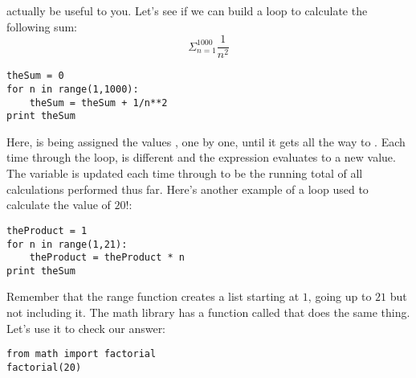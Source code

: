 actually be useful to you.  Let's see if we can build a loop to
calculate the following sum:
\begin{equation}
\Sigma_{n=1}^{1000} \frac{1}{n^2}
\end{equation}
\begin{Verbatim}
theSum = 0
for n in range(1,1000):
    theSum = theSum + 1/n**2
print theSum
\end{Verbatim}
Here,  is being assigned the values
, one by one, until it gets all the way to
.  Each time through the loop,  is different
and the expression  evaluates to a new value.  The
variable  is updated each time through to be the
running total of all calculations performed thus far.  Here's another
example of a loop used to calculate the value of $20!$:
\begin{Verbatim}
theProduct = 1
for n in range(1,21):
    theProduct = theProduct * n
print theSum
\end{Verbatim}
Remember that the range function creates a list starting at $1$, going
up to $21$ but not including it. The math library has a function
called  that does the same thing.  Let's use it to
check our answer:

\begin{Verbatim}
from math import factorial
factorial(20)
\end{Verbatim}

